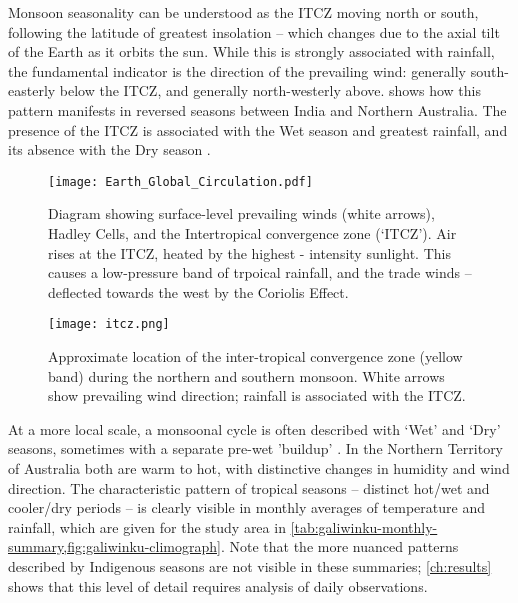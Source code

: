 Monsoon seasonality can be understood as the ITCZ moving north or south,
following the latitude of greatest insolation -- which changes due to the
axial tilt of the Earth as it orbits the sun.  While this is strongly
associated with rainfall, the fundamental indicator is the direction of
the prevailing wind: generally south-easterly below the ITCZ, and generally
north-westerly above.   shows how this pattern
manifests in reversed seasons between India and Northern Australia.
The presence of the ITCZ is associated with the Wet season and greatest
rainfall, and its absence with the Dry season \citep{sturman2005}.

\begin{figure}[p]
    \centering
    \texttt{[image: Earth\_Global\_Circulation.pdf]}
    \caption[Hadley Cells and trade-winds]{
        Diagram showing surface-level prevailing winds (white arrows),
        Hadley Cells, and the Intertropical convergence zone (`ITCZ').
        Air rises at the ITCZ, heated by the highest - intensity sunlight.
        This causes a low-pressure band of trpoical rainfall, and the
        trade winds -- deflected towards the west by the Coriolis Effect.
        \citep[image:][]{kaidor2013}
        }
    \label{fig:hadley-cells}
\vspace{1cm}
    \texttt{[image: itcz.png]}
    \caption[ITCZ showing northern and southern monsoon]{
        Approximate location of the inter-tropical convergence zone
        (yellow band) during the northern and southern monsoon.
        White arrows show prevailing wind direction; rainfall is
        associated with the ITCZ.  \citep[image:][]{boos2014}}
    \label{fig:itcz-india-aus}
\end{figure}

At a more local scale, a monsoonal cycle is often described with `Wet' and
`Dry' seasons, sometimes with a separate pre-wet 'buildup' \citep{kingsley2003}.
In the Northern Territory of Australia both are warm to hot, with distinctive
changes in humidity and wind direction.  The characteristic pattern of tropical
seasons -- distinct hot/wet and cooler/dry periods -- is clearly visible in
monthly averages of temperature and rainfall, which are given for the study
area in \cref{tab:galiwinku-monthly-summary,fig:galiwinku-climograph}.
Note that the more nuanced patterns described by Indigenous seasons are not
visible in these summaries; \cref{ch:results} shows that this level of detail
requires analysis of daily observations.



